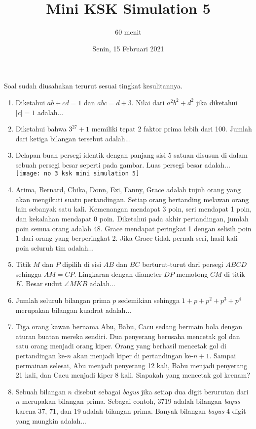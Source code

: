 \documentclass{article}
\title{Mini KSK Simulation 5}
\author{60 menit}
\date{Senin, 15 Februari 2021}
\begin{document}
	\maketitle
	
	Soal sudah diusahakan terurut sesuai tingkat kesulitannya.
	\begin{enumerate}
		\item
		Diketahui $ab+cd=1$ dan $abc=d+3$. Nilai dari $a^2b^2+d^2$ jika diketahui $|c|=1$ adalah...
		
		\item
		Diketahui bahwa $3^{27}+1$ memiliki tepat 2 faktor prima lebih dari 100. Jumlah dari ketiga bilangan tersebut adalah...
		
		\item 
		Delapan buah persegi identik dengan panjang sisi 5 satuan disusun di dalam sebuah persegi besar seperti pada gambar. Luas persegi besar adalah...\\
		\texttt{[image: no 3 ksk mini simulation 5]}
		
		\item
		Arima, Bernard, Chika, Donn, Ezi, Fanny, Grace adalah tujuh orang yang akan mengikuti suatu pertandingan. Setiap orang bertanding melawan orang lain sebanyak satu kali. Kemenangan mendapat 3 poin, seri mendapat 1 poin, dan kekalahan mendapat 0 poin. Diketahui pada akhir pertandingan, jumlah poin semua orang adalah 48. Grace mendapat peringkat 1 dengan selisih poin 1 dari orang yang berperingkat 2. Jika Grace tidak pernah seri, hasil kali poin seluruh tim adalah...
		
		\item
		Titik $M$ dan $P$ dipilih di sisi $AB$ dan $BC$ berturut-turut dari persegi $ABCD$ sehingga $AM=CP$. Lingkaran dengan diameter $DP$ memotong $CM$ di titik $K$. Besar sudut $\angle MKB$ adalah...
		
		\item
		 Jumlah seluruh bilangan prima $p$ sedemikian sehingga $1+p+p^2+p^3+p^4$ merupakan bilangan kuadrat adalah...
		 
		 \item
		 Tiga orang kawan bernama Abu, Babu, Cacu sedang bermain bola dengan aturan buatan mereka sendiri. Dua penyerang berusaha mencetak gol dan satu orang menjadi orang kiper. Orang yang berhasil mencetak gol di pertandingan ke-$n$ akan menjadi kiper di pertandingan ke-$n+1$. Sampai permainan selesai, Abu menjadi penyerang 12 kali, Babu menjadi penyerang 21 kali, dan Cacu menjadi kiper 8 kali. Siapakah yang mencetak gol keenam?
		 
		 \item
		 Sebuah bilangan $n$ disebut sebagai \textit{bagus} jika setiap dua digit berurutan dari $n$ merupakan bilangan prima. Sebagai contoh, 3719 adalah bilangan \textit{bagus} karena 37, 71, dan 19 adalah bilangan prima. Banyak bilangan \textit{bagus} 4 digit yang mungkin adalah...
	\end{enumerate}
		
\end{document}
